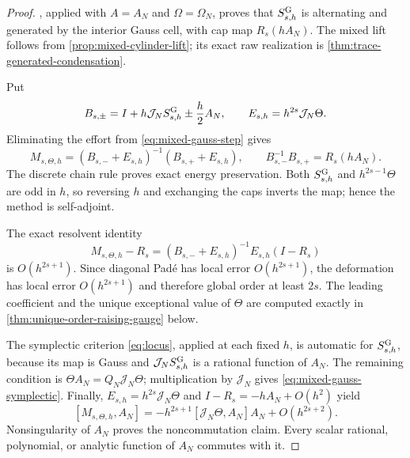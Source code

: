 \documentclass[11pt,a4paper]{article}
\begin{document}
\begin{proof}
, applied with
\(A=A_N\) and \(\Omega=\Omega_N\), proves that
\(S^{\rm G}_{s,h}\) is alternating and generated by the interior Gauss
cell, with cap map \(R_s(hA_N)\).  The mixed lift follows from
\cref{prop:mixed-cylinder-lift}; its exact raw realization is
\cref{thm:trace-generated-condensation}.

Put
\[
 B_{s,\pm}=I+h\mathcal J_NS^{\rm G}_{s,h}
             \mathbin{\pm}\frac h2A_N,
 \qquad E_{s,h}=h^{2s}\mathcal J_N\Theta.
\]
Eliminating the effort from \cref{eq:mixed-gauss-step} gives
\begin{equation}\label{eq:mixed-gauss-map-general}
 M_{s,\Theta,h}
 =(B_{s,-}+E_{s,h})^{-1}(B_{s,+}+E_{s,h}),
 \qquad B_{s,-}^{-1}B_{s,+}=R_s(hA_N).
\end{equation}
The discrete chain rule proves exact energy preservation.  Both
\(S^{\rm G}_{s,h}\) and \(h^{2s-1}\Theta\) are odd in \(h\), so reversing
\(h\) and exchanging the caps inverts the map; hence the method is
self-adjoint.

The exact resolvent identity
\[
 M_{s,\Theta,h}-R_s
 =(B_{s,-}+E_{s,h})^{-1}E_{s,h}(I-R_s)
\]
is \(O(h^{2s+1})\).  Since diagonal Pad\'e has local error
\(O(h^{2s+1})\), the deformation has local error
\(O(h^{2s+1})\) and therefore global order at least \(2s\).  The leading
coefficient and the unique exceptional value of \(\Theta\) are computed
exactly in \cref{thm:unique-order-raising-gauge} below.

The symplectic criterion \cref{eq:locus}, applied at each fixed \(h\),
is automatic for \(S^{\rm G}_{s,h}\), because its map is Gauss and
\(\mathcal J_NS^{\rm G}_{s,h}\) is a rational function of \(A_N\).
The remaining condition is
\(\Theta A_N=Q_N\mathcal J_N\Theta\); multiplication by
\(\mathcal J_N\) gives \cref{eq:mixed-gauss-symplectic}.  Finally,
\(E_{s,h}=h^{2s}\mathcal J_N\Theta\) and
\(I-R_s=-hA_N+O(h^2)\) yield
\begin{equation}\label{eq:mixed-map-commutator}
 [M_{s,\Theta,h},A_N]
 =-h^{2s+1}[\mathcal J_N\Theta,A_N]A_N
  +O(h^{2s+2}).
\end{equation}
Nonsingularity of \(A_N\) proves the noncommutation claim.  Every scalar
rational, polynomial, or analytic function of \(A_N\) commutes with it.
\end{proof}
\end{document}
